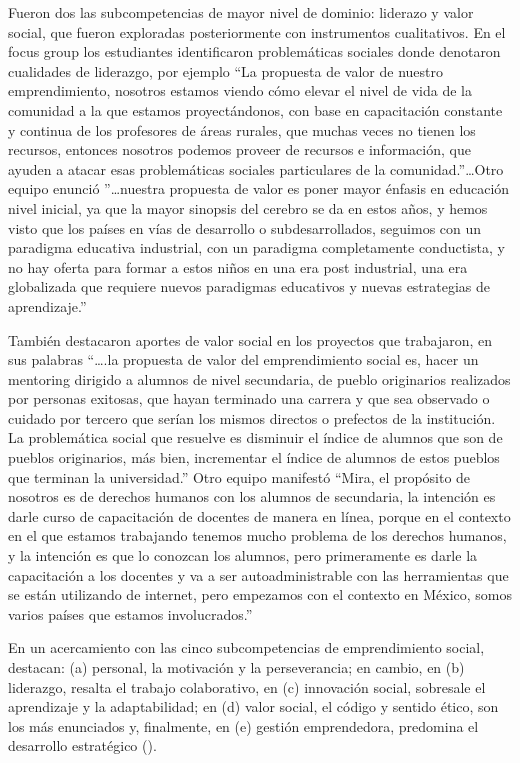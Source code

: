 \documentclass[spanish]{textolivre}
\begin{document}
Fueron dos las subcompetencias de mayor nivel de dominio: liderazo y valor social, que fueron exploradas posteriormente con instrumentos cualitativos. En el focus group los estudiantes identificaron problemáticas sociales donde denotaron cualidades de liderazgo, por ejemplo “La propuesta de valor de nuestro emprendimiento, nosotros estamos viendo cómo elevar el nivel de vida de la comunidad a la que estamos proyectándonos, con base en capacitación constante y continua de los profesores de áreas rurales, que muchas veces no tienen los recursos, entonces nosotros podemos proveer de recursos e información, que ayuden a atacar esas problemáticas sociales particulares de la comunidad.”…Otro equipo enunció ”…nuestra propuesta de valor es poner mayor énfasis en educación nivel inicial, ya que la mayor sinopsis del cerebro se da en estos años, y hemos visto que los países en vías de desarrollo o subdesarrollados, seguimos con un paradigma educativa industrial, con un paradigma completamente conductista, y no hay oferta para formar a estos niños en una era post industrial, una era globalizada que requiere nuevos paradigmas educativos y nuevas estrategias de aprendizaje.”

También destacaron aportes de valor social en los proyectos que trabajaron, en sus palabras “….la propuesta de valor del emprendimiento social es, hacer un mentoring dirigido a alumnos de nivel secundaria, de pueblo originarios realizados por personas exitosas, que hayan terminado una carrera y que sea observado o cuidado por tercero que serían los mismos directos o prefectos de la institución. La problemática social que resuelve es disminuir el índice de alumnos que son de pueblos originarios, más bien, incrementar el índice de alumnos de estos pueblos que terminan la universidad.” Otro equipo manifestó “Mira, el propósito de nosotros es de derechos humanos con los alumnos de secundaria, la intención es darle curso de capacitación de docentes de manera en línea, porque en el contexto en el que estamos trabajando tenemos mucho problema de los derechos humanos, y la intención es que lo conozcan los alumnos, pero primeramente es darle la capacitación a los docentes y va a ser autoadministrable con las herramientas que se están utilizando de internet, pero empezamos con el contexto en México, somos varios países que estamos involucrados.”

En un acercamiento con las cinco subcompetencias de emprendimiento social, destacan: (a) personal, la motivación y la perseverancia; en cambio, en (b) liderazgo, resalta el trabajo colaborativo, en (c) innovación social, sobresale el aprendizaje y la adaptabilidad; en (d)  valor social, el código y sentido ético, son los más enunciados y, finalmente, en (e) gestión emprendedora, predomina el desarrollo estratégico ().
\end{document}
